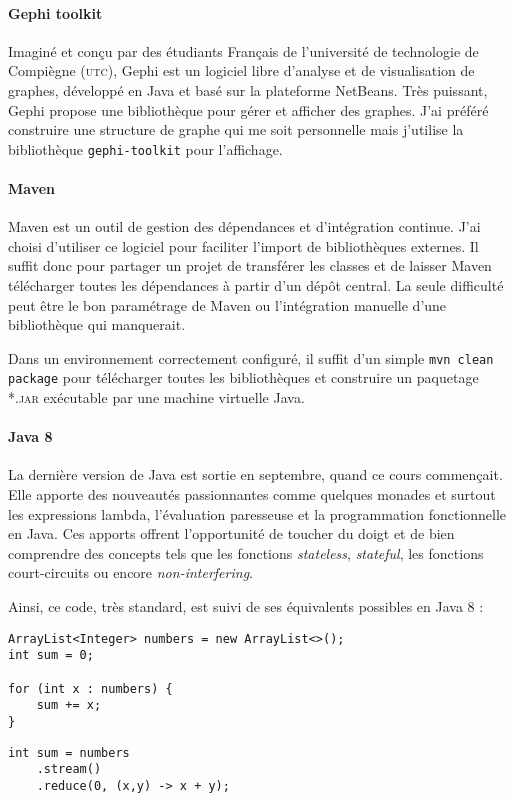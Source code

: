 \documentclass[12pt,onecolumn]{article}
\begin{document}
\paragraph{Gephi toolkit}

Imaginé et conçu par des étudiants Français de l'université de technologie de Compiègne (\textsc{utc}), Gephi est un logiciel libre d'analyse et de visualisation de graphes, développé en Java et basé sur la plateforme NetBeans. Très puissant, Gephi propose une bibliothèque pour gérer et afficher des graphes. J'ai préféré construire une structure de graphe qui me soit personnelle mais j'utilise la bibliothèque \texttt{gephi-toolkit} pour l'affichage.

\paragraph{Maven}

Maven est un outil de gestion des dépendances et d'intégration continue. J'ai choisi d'utiliser ce logiciel pour faciliter l'import de bibliothèques externes. Il suffit donc pour partager un projet de transférer les classes et de laisser Maven télécharger toutes les dépendances à partir d'un dépôt central. La seule difficulté peut être le bon paramétrage de Maven ou l'intégration manuelle d'une bibliothèque qui manquerait.

Dans un environnement correctement configuré, il suffit d'un simple \texttt{mvn clean package} pour télécharger toutes les bibliothèques et construire un paquetage \textsc{*.jar} exécutable par une machine virtuelle Java.

\paragraph{Java 8} La dernière version de Java est sortie en septembre, quand ce cours commençait. Elle apporte des nouveautés passionnantes comme quelques monades et surtout les expressions lambda, l'évaluation paresseuse et la programmation fonctionnelle en Java. Ces apports offrent l'opportunité de toucher du doigt et de bien comprendre des concepts tels que les fonctions \textsl{stateless}, \textsl{stateful}, les fonctions court-circuits ou encore \textsl{non-interfering}.

Ainsi, ce code, très standard, est suivi de ses équivalents possibles en Java 8 :
\begin{lstlisting}[caption={Somme des éléments d'un tableau en Java 7}]
ArrayList<Integer> numbers = new ArrayList<>();
int sum = 0;

for (int x : numbers) {
	sum += x;
}
\end{lstlisting}
\begin{lstlisting}[caption={Une autre manière de faire en java 8}]
int sum = numbers
	.stream()
	.reduce(0, (x,y) -> x + y);
\end{lstlisting}
\end{document}
